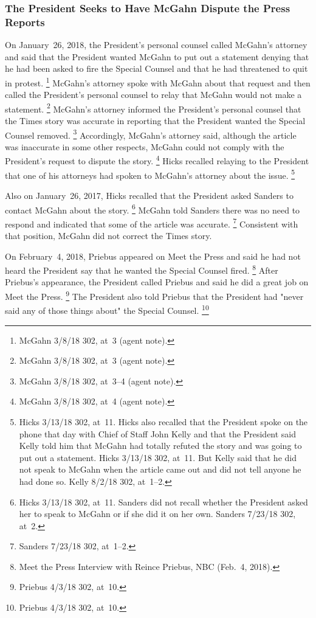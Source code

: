 \subsubsection{The President Seeks to Have McGahn Dispute the Press Reports}

On January~26, 2018, the President's personal counsel called McGahn's attorney and said that the President wanted McGahn to put out a statement denying that he had been asked to fire the Special Counsel and that he had threatened to quit in protest.%
\footnote{McGahn 3/8/18 302, at~3 (agent note).}
McGahn's attorney spoke with McGahn about that request and then called the President's personal counsel to relay that McGahn would not make a statement.%
\footnote{McGahn 3/8/18 302, at~3 (agent note).}
McGahn's attorney informed the President's personal counsel that the Times story was accurate in reporting that the President wanted the Special Counsel removed.%
\footnote{McGahn 3/8/18 302, at~3--4 (agent note).}
Accordingly, McGahn's attorney said, although the article was inaccurate in some other respects, McGahn could not comply with the President's request to dispute the story.%
\footnote{McGahn 3/8/18 302, at~4 (agent note).}
Hicks recalled relaying to the President that one of his attorneys had spoken to McGahn's attorney about the issue.%
\footnote{Hicks 3/13/18 302, at~11.
Hicks also recalled that the President spoke on the phone that day with Chief of Staff John Kelly and that the President said Kelly told him that McGahn had totally refuted the story and was going to put out a statement.
Hicks 3/13/18 302, at~11.
But Kelly said that he did not speak to McGahn when the article came out and did not tell anyone he had done so.
Kelly 8/2/18 302, at~1--2.}

Also on January~26, 2017, Hicks recalled that the President asked Sanders to contact McGahn about the story.%
\footnote{Hicks 3/13/18 302, at~11.
Sanders did not recall whether the President asked her to speak to McGahn or if she did it on her own.
Sanders 7/23/18 302, at~2.}
McGahn told Sanders there was no need to respond and indicated that some of the article was accurate.%
\footnote{Sanders 7/23/18 302, at~1--2.}
Consistent with that position, McGahn did not correct the Times story.

On February~4, 2018, Priebus appeared on Meet the Press and said he had not heard the President say that he wanted the Special Counsel fired.%
\footnote{Meet the Press Interview with Reince Priebus, NBC (Feb.~4, 2018).}
After Priebus's appearance, the President called Priebus and said he did a great job on Meet the Press.%
\footnote{Priebus 4/3/18 302, at~10.}
The President also told Priebus that the President had "never said any of those things about" the Special Counsel.%
\footnote{Priebus 4/3/18 302, at~10.}

